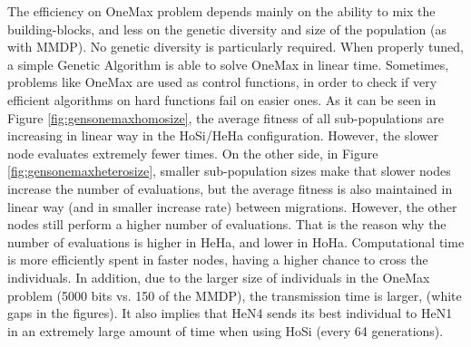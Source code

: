 \documentclass[final,1p,times]{elsarticle}
\begin{document}
The efficiency on OneMax problem depends mainly on the ability to mix
the building-blocks, and less on the genetic diversity and size of the
population (as with MMDP). No genetic diversity is particularly
required. When properly tuned, a simple Genetic Algorithm is able to
solve OneMax in linear time. Sometimes, problems like OneMax are used
as control functions, in order to check if very efficient algorithms
on hard functions fail on easier ones. As it can be seen in Figure
\ref{fig:gensonemaxhomosize}, the average fitness of all sub-populations
are increasing in linear way in the HoSi/HeHa configuration. However,
the slower node evaluates extremely fewer times.  On the other
side, in Figure \ref{fig:gensonemaxheterosize}, smaller sub-population
sizes make that slower nodes increase the number of evaluations,
but the average fitness is also maintained in linear way (and in
smaller increase rate) between migrations. However, the other
nodes still perform a higher number of evaluations. That is the
reason why the number of evaluations is higher in HeHa, and lower in
HoHa. Computational time is more efficiently spent in faster nodes,
having a higher chance to cross the individuals. In addition, due to
the larger size of  individuals in the OneMax problem (5000 bits
vs. 150 of the MMDP), the transmission time is larger, (white gaps in the
figures). It also implies that HeN4 sends its best individual to
HeN1 in an extremely large amount of time when using HoSi (every 64
generations). 

\begin{table}
\centering
\caption{Results for the OneMax problem.}
\label{tab:onemaxresults}
\end{table}
\end{document}
